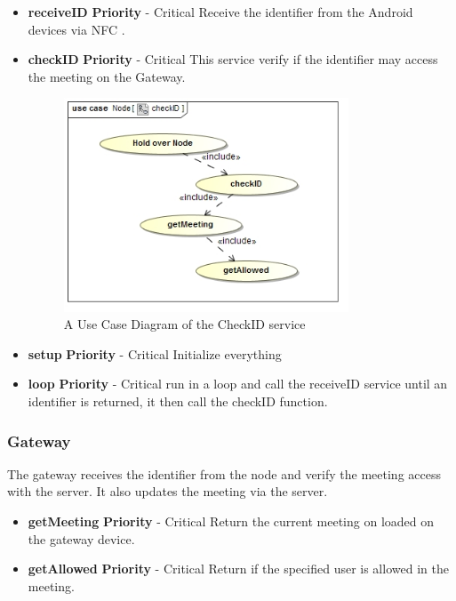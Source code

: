 \documentclass[a4paper,12pt,titlepage]{article}
\begin{document}
		\begin{itemize}
			\item \textbf{receiveID}
				\newline\textbf{ Priority } - Critical
				\newline Receive the identifier from the Android devices via NFC .
			\item \textbf{checkID}
				\newline\textbf{ Priority } - Critical
				\newline This service verify if the identifier may access the meeting on the Gateway. 
				\begin{figure}[h!]
 					 \centering
					  \includegraphics[width=0.8\textwidth]{CheckIDUseCase}
		 			 \caption{A Use Case Diagram of the CheckID service}
				\end{figure}
			\item \textbf{setup}
				\newline\textbf{ Priority } - Critical
				\newline Initialize everything
			\item \textbf{loop}
				\newline\textbf{ Priority } - Critical
				\newline run in a loop and call the receiveID service until an identifier is returned, it then call the checkID function.

		\end{itemize}

		\subsubsection{Gateway} The gateway receives the identifier from the node and verify the meeting access with the server. It also updates the meeting via the server.
		\begin{itemize}
			\item \textbf{getMeeting}
				\newline\textbf{ Priority } - Critical
				\newline Return the current meeting on loaded on the gateway device.
			\item \textbf{getAllowed}
				\newline\textbf{ Priority } - Critical
				\newline Return if the specified user is allowed in the meeting.
			

		\end{itemize}
\end{document}
